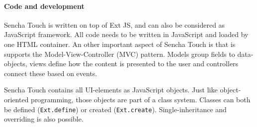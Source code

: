 \documentclass[a4paper]{article}
\newcommand{\term}[1]{\emph{#1}}
\newcommand{\code}[1]{\texttt{#1}}
\begin{document}

\paragraph{Code and development}
Sencha Touch is written on top of Ext JS,  and can also be considered as JavaScript framework.  All code needs to be written in JavaScript and loaded by one HTML container.  An other important aspect of Sencha Touch is that is supports the Model-View-Controller (MVC) pattern.  Models group fields to data-objects,  views define how the content is presented to the user and controllers connect these based on events.
 



Sencha Touch contains all UI-elements as JavaScript objects.  Just like object-oriented programming,  those objects are part of a class system.  Classes can both be defined (\code{Ext.define}) or created (\code{Ext.create}).  Single-inheritance and overriding is also possible.    
\end{document}

